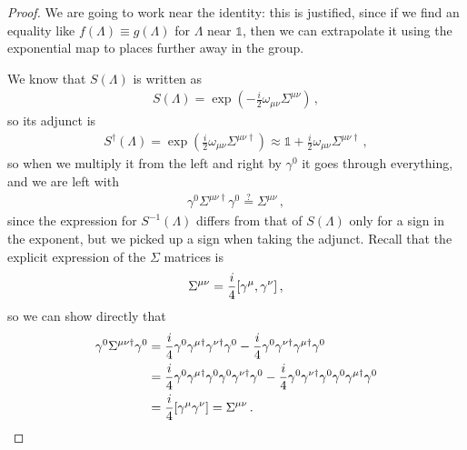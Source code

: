 \documentclass[main.tex]{subfiles}
\begin{document}
\begin{proof}
We are going to work near the identity: this is justified, since if we find an equality like \(f(\Lambda ) \equiv g(\Lambda )\) for \(\Lambda \) near \(\mathbb{1}\), then we can extrapolate it using the exponential map to places further away in the group.


We know that \(S(\Lambda )\) is written as 
%
\begin{align}
S(\Lambda )=   \exp( -\frac{i}{2} \omega_{\mu \nu } \Sigma^{\mu \nu })
\,,
\end{align}
%
so its adjunct is 
%
\begin{align}
S ^\dag (\Lambda ) = \exp( \frac{i}{2} \omega_{\mu \nu } \Sigma^{\mu \nu \dag}) \approx \mathbb{1} + \frac{i}{2} \omega_{\mu \nu } \Sigma^{\mu \nu \dag}
\,,
\end{align}
%
so when we multiply it from the left and right by \(\gamma^{0}\) it goes through everything, and we are left with 
%
\begin{align}
\gamma^{0} \Sigma^{\mu \nu \dag} \gamma^{0} \overset{?}{=} 
\Sigma^{\mu \nu }
\,,
\end{align}
%
since the expression for \(S^{-1}(\Lambda )\) differs from that of \(S(\Lambda )\) only for a sign in the exponent, but we picked up a sign when taking the adjunct. 
Recall that the explicit expression of the \(\Sigma \) matrices is 
%
\begin{align}
\Sigma^{\mu \nu } = \frac{i}{4} \qty[\gamma^{\mu }, \gamma^{\nu }]
\,,
\end{align}
%
so we can show directly that 
%
\begin{subequations}
\begin{align}
\gamma^{0} \Sigma^{\mu \nu \dag} \gamma^{0} &=
\frac{i}{4} \gamma^{0} \gamma^{\mu \dag}  \gamma^{\nu\dag } \gamma^{0 }
-\frac{i}{4} \gamma^{0} \gamma^{\nu\dag }  \gamma^{\mu \dag} \gamma^{0 } \\
&= 
\frac{i}{4} \gamma^{0} \gamma^{\mu \dag} \gamma^{0} \gamma^{0} \gamma^{\nu\dag } \gamma^{0 }
-\frac{i}{4} \gamma^{0} \gamma^{\nu\dag }  \gamma^{0} \gamma^{0} \gamma^{\mu \dag} \gamma^{0 }  \\
&= \frac{i}{4} \qty[\gamma^{\mu } \gamma^{\nu }] = \Sigma^{\mu \nu }
\,.
\end{align}
\end{subequations}
\end{proof}
\end{document}
